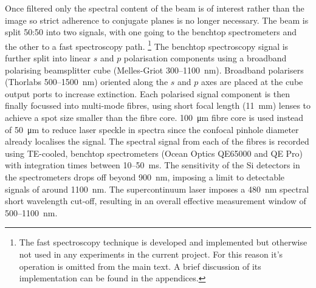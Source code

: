\documentclass{article}
\begin{document}
Once filtered only the spectral content of the beam is of interest rather than the image so strict adherence to conjugate planes is no longer necessary. The beam is split 50:50 into two signals, with one going to the benchtop spectrometers and the other to a fast spectroscopy path.%
\footnote{The fast spectroscopy technique is developed and implemented but otherwise not used in any experiments in the current project. For this reason it's operation is omitted from the main text. A brief discussion of its implementation can be found in the appendices.}
The benchtop spectroscopy signal is further split into linear $s$ and $p$ polarisation components using a broadband polarising beamsplitter cube (Melles-Griot 300--\SI{1100}{nm}). Broadband polarisers (Thorlabs 500--\SI{1500}{nm}) oriented along the $s$ and $p$ axes are placed at the cube output ports to increase extinction. Each polarised signal component is then finally focussed into multi-mode fibres, using short focal length (\SI{11}{mm}) lenses to achieve a spot size smaller than the fibre core. \SI{100}{\micro\metre} fibre core is used instead of \SI{50}{\micro\metre} to reduce laser speckle in spectra since the confocal pinhole diameter already localises the signal.
The spectral signal from each of the fibres is recorded using TE-cooled, benchtop spectrometers (Ocean Optics QE65000 and QE Pro) with integration times between 10--\SI{50}{ms}. The sensitivity of the Si detectors in the spectrometers drops off beyond \SI{900}{nm}, imposing a limit to detectable signals of around \SI{1100}{nm}. The supercontinuum laser imposes a \SI{480}{nm} spectral short wavelength cut-off, resulting in an overall effective measurement window of 500--\SI{1100}{nm}.
\end{document}
